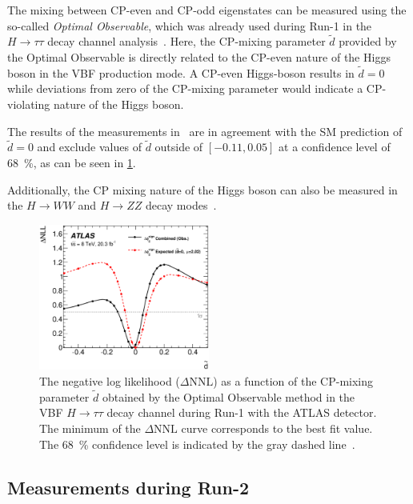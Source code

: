 The mixing between CP-even and CP-odd eigenstates can be measured using the so-called \emph{Optimal Observable}, which
was already used during Run-1 in the $H \to \tau\tau$ decay channel analysis~\cite{HiggsCPTauTau}.
Here, the CP-mixing parameter $\tilde{d}$ provided by the Optimal Observable is directly related to the CP-even nature of the Higgs boson in the
VBF production mode.
A CP-even Higgs-boson results in $\tilde{d} = 0$ while deviations from zero of the CP-mixing parameter would indicate a CP-violating nature of the Higgs boson.

The results of the measurements in~\cite{HiggsCPTauTau} are in agreement with the SM prediction of $\tilde{d} = 0$ and exclude values of $\tilde{d}$ outside of
$\left[-0.11, 0.05\right]$ at a confidence level of \SI{68}{\percent}, as can be seen in \cref{fig:theory:meas:run1:oo}.

Additionally, the CP mixing nature of the Higgs boson can also be measured in the $H \to WW$ and $H \to ZZ$ decay modes~\cite{CPBosonATLAS,CPBosonCMS}.

\begin{figure}[htbp]
    \centering
    \includegraphics[width=0.5\textwidth]{./figures/theory/cpeven_dtilde.eps}
    \caption{The negative log likelihood ($\Delta \text{NNL}$) as a function of the CP-mixing parameter $\tilde{d}$
             obtained by the Optimal Observable method in the VBF $H\to\tau\tau$ decay channel during Run-1 with the ATLAS detector.
             The minimum of the $\Delta \text{NNL}$ curve corresponds to the best fit value.
             The \SI{68}{\percent} confidence level is indicated by the gray dashed line~\cite{HiggsCPTauTau}.}\label{fig:theory:meas:run1:oo}
\end{figure}

\FloatBarrier{}

\subsection{Measurements during Run-2}\label{sub:theory:meas:run2}


